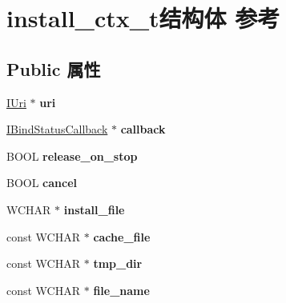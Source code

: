 \hypertarget{structinstall__ctx__t}{}\section{install\+\_\+ctx\+\_\+t结构体 参考}
\label{structinstall__ctx__t}
\subsection*{Public 属性}
\begin{DoxyCompactItemize}
\item 
\mbox{\label{structinstall__ctx__t_aa53dcc94b9d75b8207565186502e311b}} 
\hyperlink{interface_i_uri}{I\+Uri} $\ast$ {\bfseries uri}
\item 
\mbox{\label{structinstall__ctx__t_af61f8ea9c79e68622a6b518695c2f6bb}} 
\hyperlink{interface_i_bind_status_callback}{I\+Bind\+Status\+Callback} $\ast$ {\bfseries callback}
\item 
\mbox{\label{structinstall__ctx__t_adf67c878fb173a771b0f190b6a9360d5}} 
B\+O\+OL {\bfseries release\+\_\+on\+\_\+stop}
\item 
\mbox{\label{structinstall__ctx__t_afdcbc4e24fc10627c32c785ddbfc51a4}} 
B\+O\+OL {\bfseries cancel}
\item 
\mbox{\label{structinstall__ctx__t_ae0380d5aa0b94951bdca8daae81bac53}} 
W\+C\+H\+AR $\ast$ {\bfseries install\+\_\+file}
\item 
\mbox{\label{structinstall__ctx__t_a40c261d64cd67846e29259fdc1c4726c}} 
const W\+C\+H\+AR $\ast$ {\bfseries cache\+\_\+file}
\item 
\mbox{\label{structinstall__ctx__t_a8974955176e8f046f3c5f577111d68b5}} 
const W\+C\+H\+AR $\ast$ {\bfseries tmp\+\_\+dir}
\item 
\mbox{\label{structinstall__ctx__t_afb2fb7158363a472e9b2468cf09beb86}} 
const W\+C\+H\+AR $\ast$ {\bfseries file\+\_\+name}
\item 
\mbox{\label{structinstall__ctx__t_a0112880eb1c5377bae6355be9cdb057d}} 

\end{DoxyCompactItemize}
